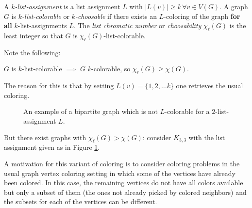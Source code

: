 \begin{definition}
A \emph{$k$-list-assignment} is a list assignment $L$ with $|L(v)| \geq k \, \forall v \in V(G)$. 
A graph $G$ is \emph{$k$-list-colorable} or \emph{$k$-choosable} if there exists an $L$-coloring
of the graph \textbf{for all} $k$-list-assignments $L$. 
The \emph{list chromatic number} or \emph{choosability} $\chi_{\ell}(G)$ is the least integer
so that $G$ is $\chi_{\ell}(G)$-list-colorable.
\end{definition}

Note the following:

\begin{observation}
$G$ is $k$-list-colorable $\implies$ $G$ $k$-colorable, so $\chi_{\ell}(G) \geq \chi(G)$.
\end{observation}

The reason for this is that by setting $L(v) = \{1, 2, \ldots k\}$ one retrieves the usual coloring.

\begin{figure}
\label{fig:k33not2lcolorable}
\centering
\begin{center}
\end{center}
\caption{An example of a bipartite graph which is not $L$-colorable for a $2$-list-assignment $L$.}
\end{figure}

But there exist graphs with $\chi_{\ell}(G) > \chi(G)$: consider $K_{3, 3}$ with the list
assignment given as in Figure \ref{fig:k33not2lcolorable}.

A motivation for this variant of coloring is to consider coloring problems in the usual graph vertex
coloring setting in which some of the vertices have already been colored. In this case, the 
remaining vertices do not have all colors available but only a subset of them (the ones not already
picked by colored neighbors) and the subsets for each of the vertices can be different. 

